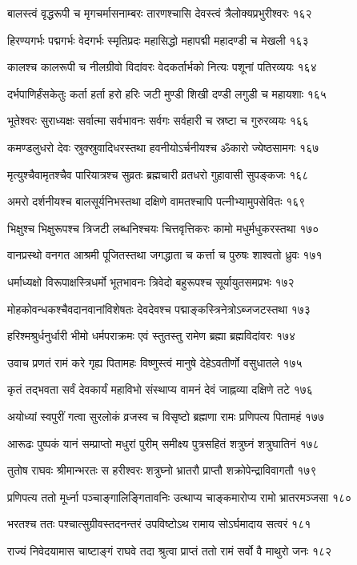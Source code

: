 बालस्त्वं वृद्धरूपी च मृगचर्मासनाम्बरः
तारणश्चासि देवस्त्वं त्रैलोक्यप्रभुरीश्वरः १६२

हिरण्यगर्भः पद्मगर्भः वेदगर्भः स्मृतिप्रदः
महासिद्धो महापद्मी महादण्डी च मेखली १६३

कालश्च कालरूपी च नीलग्रीवो विदांवरः
वेदकर्तार्भको नित्यः पशूनां पतिरव्ययः १६४

दर्भपाणिर्हंसकेतुः कर्ता हर्ता हरो हरिः
जटी मुण्डी शिखी दण्डी लगुडी च महायशाः १६५

भूतेश्वरः सुराध्यक्षः सर्वात्मा सर्वभावनः
सर्वगः सर्वहारी च स्रष्टा च गुरुरव्ययः १६६

कमण्डलुधरो देवः स्रुक्स्रुवादिधरस्तथा
हवनीयोऽर्चनीयश्च ॐकारो ज्येष्ठसामगः १६७

मृत्युश्चैवामृतश्चैव पारियात्रश्च सुव्रतः
ब्रह्मचारी व्रतधरो गुहावासी सुपङ्कजः १६८

अमरो दर्शनीयश्च बालसूर्यनिभस्तथा
दक्षिणे वामतश्चापि पत्नीभ्यामुपसेवितः १६९

भिक्षुश्च भिक्षुरूपश्च त्रिजटी लब्धनिश्चयः
चित्तवृत्तिकरः कामो मधुर्मधुकरस्तथा १७०

वानप्रस्थो वनगत आश्रमी पूजितस्तथा
जगद्धाता च कर्त्ता च पुरुषः शाश्वतो ध्रुवः १७१

धर्माध्यक्षो विरूपाक्षस्त्रिधर्मो भूतभावनः
त्रिवेदो बहुरूपश्च सूर्यायुतसमप्रभः १७२

मोहकोवन्धकश्चैवदानवानांविशेषतः
देवदेवश्च पद्माङ्कस्त्रिनेत्रोऽब्जजटस्तथा १७३

हरिश्मश्रुर्धनुर्धारी भीमो धर्मपराक्रमः
एवं स्तुतस्तु रामेण ब्रह्मा ब्रह्मविदांवरः १७४

उवाच प्रणतं रामं करे गृह्य पितामहः
विष्णुस्त्वं मानुषे देहेऽवतीर्णो वसुधातले १७५

कृतं तद्भवता सर्वं देवकार्यं महाविभो
संस्थाप्य वामनं देवं जाह्नव्या दक्षिणे तटे १७६

अयोध्यां स्वपुरीं गत्वा सुरलोकं व्रजस्व च
विसृष्टो ब्रह्मणा रामः प्रणिपत्य पितामहं १७७

आरूढः पुष्पकं यानं सम्प्राप्तो मधुरां पुरीम्
समीक्ष्य पुत्रसहितं शत्रुघ्नं शत्रुघातिनं १७८

तुतोष राघवः श्रीमान्भरतः स हरीश्वरः
शत्रुघ्नो भ्रातरौ प्राप्तौ शक्रोपेन्द्राविवागतौ १७९

प्रणिपत्य ततो मूर्ध्ना पञ्चाङ्गालिङ्गितावनिः
उत्थाप्य चाङ्कमारोप्य रामो भ्रातरमञ्जसा १८०

भरतश्च ततः पश्चात्सुग्रीवस्तदनन्तरं
उपविष्टोऽथ रामाय सोऽर्घमादाय सत्वरं १८१

राज्यं निवेदयामास चाष्टाङ्गं राघवे तदा
श्रुत्वा प्राप्तं ततो रामं सर्वो वै माथुरो जनः १८२


